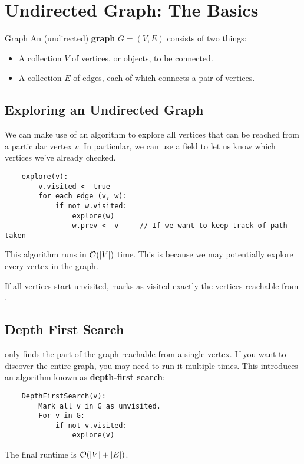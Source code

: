 \documentclass[letterpaper]{article}
\begin{document}
\newpage 

\begingroup
    \renewcommand\contentsname{Table of Contents}
    \tableofcontents
\endgroup

\newpage
{}

\section{Undirected Graph: The Basics}
\begin{definition}{Graph}{}
    An (undirected) \textbf{graph} $G = (V, E)$ consists of two things:
    \begin{itemize}
        \item A collection $V$ of vertices, or objects, to be connected.
        \item A collection $E$ of edges, each of which connects a pair of vertices.
    \end{itemize}
\end{definition}

\subsection{Exploring an Undirected Graph}
We can make use of an  algorithm to explore all vertices that can be reached from a particular vertex $v$. In particular, we can use a field  to let us know which vertices we've already checked.
\begin{verbatim}
    explore(v):
        v.visited <- true 
        for each edge (v, w):
            if not w.visited:
                explore(w)
                w.prev <- v     // If we want to keep track of path taken
\end{verbatim}
This algorithm runs in $\mathcal{O}(|V|)$ time. This is because we may potentially explore every vertex in the graph. 

\begin{theorem}{}{}
    If all vertices start unvisited,  marks as visited exactly the vertices reachable from .
\end{theorem}


\subsection{Depth First Search}
 only finds the part of the graph reachable from a single vertex. If you want to discover the entire graph, you may need to run it multiple times. This introduces an algorithm known as \textbf{depth-first search}:
\begin{verbatim}
    DepthFirstSearch(v):
        Mark all v in G as unvisited. 
        For v in G:
            if not v.visited:
                explore(v)
\end{verbatim}
The final runtime is $\mathcal{O}(|V| + |E|)$. 
\end{document}
